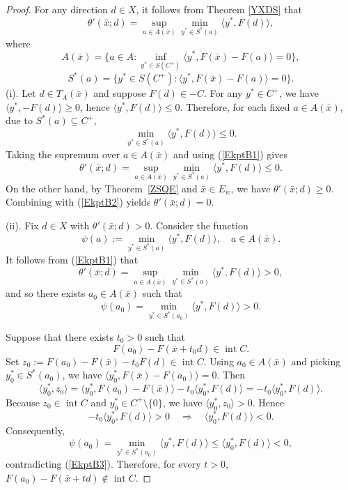 \documentclass[11pt]{article}
\begin{document}
\begin{proof}  For any direction $d\in X$,   it follows from  Theorem   \ref{YXDS}  that
\begin{equation}\label{EkptB1}
	\theta'(\bar x;d)=\sup_{a\in A(\bar x)}\min_{y^*\in S^*(a)}\langle y^*,F(d)\rangle,
 \end{equation}
	where
	\[
	A(\bar x)=\bigl\{a\in A:\inf_{y^*\in S(C^+)}\langle y^*,F(\bar x)-F(a)\rangle=0\bigr\},
	\]
	\[
	S^*(a)=\bigl\{y^*\in S(C^+):\langle y^*,F(\bar x)-F(a)\rangle=0\bigr\}.
	\]
	 (i).	Let $d \in T_A(\bar x)$ and suppose $F(d) \in -C$. For any $y^* \in C^+$,  we have $\langle y^*, -F(d) \rangle \ge 0$, hence $\langle y^*, F(d) \rangle \le 0$.
	Therefore, for each fixed $a \in A(\bar x)$, due to $S^*(a) \subseteq C^+$,
	\[
	\min_{y^* \in S^*(a)} \langle y^*, F(d) \rangle \le 0.
	\]
	Taking the supremum over $a \in A(\bar x)$ and using  (\ref{EkptB1}) gives
\begin{equation}\label{EkptB2}
	\theta'(\bar x; d) = \sup_{a \in A(\bar x)} \min_{y^* \in S^*(a)} \langle y^*, F(d) \rangle \le 0.
 \end{equation}
	On the other hand, by Theorem~\ref{ZSQE} and $\bar x \in E_w$, we have $\theta'(\bar x; d) \ge 0$. Combining with    (\ref{EkptB2})    yields $\theta'(\bar x; d) = 0$.
	
 
(ii).	Fix $d \in X$ with $\theta'(\bar x; d) > 0$. Consider the function
	\[
	\psi(a) := \min_{y^* \in S^*(a)} \langle y^*, F(d) \rangle, \quad a \in A(\bar x).
	\]
 It follows from  (\ref{EkptB1})  that
	\[
	\theta'(\bar x; d) = \sup_{a \in A(\bar x)} \min_{y^* \in S^*(a)} \langle y^*, F(d) \rangle > 0,
	\]
and so	there exists $a_0 \in A(\bar x)$ such that
\begin{equation}\label{EkptB3}
	\psi(a_0) = \min_{y^* \in S^*(a_0)} \langle y^*, F(d) \rangle > 0.
 \end{equation}
	
	Suppose that there exists $t_0 > 0$ such that
	\[
	F(a_0) - F(\bar x + t_0 d) \in \operatorname{int} C.
	\]
	Set $z_0 := F(a_0) - F(\bar x) - t_0 F(d) \in \operatorname{int} C$.
	Using $a_0 \in A(\bar x)$ and picking   $y_0^* \in S^*(a_0)$, we have
$	\langle y_0^*, F(\bar x) - F(a_0) \rangle = 0  $.
	Then
	\[
	\langle y_0^*, z_0 \rangle = \langle y_0^*, F(a_0) - F(\bar x) \rangle - t_0 \langle y_0^*, F(d) \rangle = -t_0 \langle y_0^*, F(d) \rangle.
	\]
	Because $z_0 \in \operatorname{int} C$ and $y_0^* \in C^+ \setminus \{0\}$, we   have $\langle y_0^*, z_0 \rangle > 0$. Hence
	\[
	-t_0 \langle y_0^*, F(d) \rangle > 0 \quad \Longrightarrow \quad \langle y_0^*, F(d) \rangle < 0.
	\]
	Consequently,
	\[
	\psi(a_0) = \min_{y^* \in S^*(a_0)} \langle y^*, F(d) \rangle \le \langle y_0^*, F(d) \rangle < 0,
	\]
	contradicting (\ref{EkptB3}). Therefore, for every $t > 0$, $F(a_0) - F(\bar x + t d) \notin \operatorname{int} C$.
\end{proof}
\end{document}
